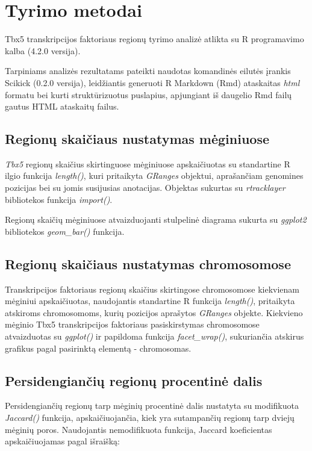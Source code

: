 \documentclass[12pt]{article}
\begin{document}

\section{Tyrimo metodai}
Tbx5 transkripcijos faktoriaus regionų tyrimo analizė atlikta su R programavimo
kalba\cite{R} (4.2.0 versija).

Tarpiniams analizės rezultatams pateikti naudotas komandinės eilutės įrankis
Scikick\cite{SCIK} (0.2.0 versija), leidžiantis generuoti R Markdown (Rmd)
ataskaitas \emph{html} formatu bei kurti struktūrizuotus puslapius, apjungiant
iš daugelio Rmd failų gautus HTML ataskaitų failus.

\subsection{Regionų skaičiaus nustatymas mėginiuose}
\emph{Tbx5} regionų skaičius skirtinguose mėginiuose apskaičiuotas su
standartine R ilgio funkcija \emph{length()}, kuri pritaikyta \emph{GRanges}
objektui, aprašančiam genomines pozicijas bei su jomis susijusias anotacijas.
Objektas sukurtas su \emph{rtracklayer}\cite{R_TRACK} bibliotekos funkcija
\emph{import()}.

Regionų skaičių mėginiuose atvaizduojanti stulpelinė diagrama sukurta su
\emph{ggplot2}\cite{R_GGPLOT} bibliotekos \emph{geom\_bar()} funkcija.

\subsection{Regionų skaičiaus nustatymas chromosomose}
Transkripcijos faktoriaus regionų skaičius skirtingose chromosomose kiekvienam
mėginiui apskaičiuotas, naudojantis standartine R funkcija \emph{length()},
pritaikyta atskiroms chromosomoms, kurių pozicijos aprašytos \emph{GRanges}
objekte. Kiekvieno mėginio Tbx5 transkripcijos faktoriaus pasiskirstymas
chromosomose atvaizduotas su \emph{ggplot()} ir papildoma funkcija
\emph{facet\_wrap()}, sukuriančia atskirus grafikus pagal pasirinktą elementą -
chromosomas.

\subsection{Persidengiančių regionų procentinė dalis}
Persidengiančių regionų tarp mėginių procentinė dalis nustatyta su modifikuota
\emph{Jaccard()} funkcija, apskaičiuojančia, kiek yra sutampančių regionų tarp
dviejų mėginių poros. Naudojantis nemodifikuota funkcija, Jaccard koeficientas
apskaičiuojamas pagal išraišką:
\end{document}
